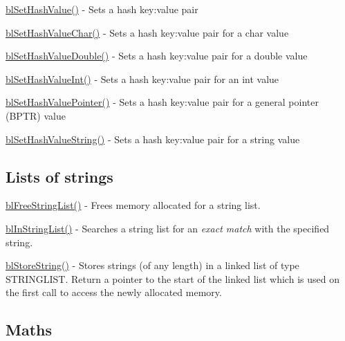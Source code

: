 \begin{DoxyItemize}
\item \hyperlink{hash_8c_a031d7ec8e0fbf9b3c44bbd024e8c7382}{bl\-Set\-Hash\-Value()} -\/ Sets a hash key\-:value pair
\item \hyperlink{hash_8c_a89d6ea94e8f4a1c4f385d29490f4d516}{bl\-Set\-Hash\-Value\-Char()} -\/ Sets a hash key\-:value pair for a char value
\item \hyperlink{hash_8c_adade2513a460bbbe4a8680226b894927}{bl\-Set\-Hash\-Value\-Double()} -\/ Sets a hash key\-:value pair for a double value
\item \hyperlink{hash_8c_a86e24fa6cec7538d295099ec761f40fc}{bl\-Set\-Hash\-Value\-Int()} -\/ Sets a hash key\-:value pair for an int value
\item \hyperlink{hash_8c_a91ff829e21fc02d7a0425b6b7fe33428}{bl\-Set\-Hash\-Value\-Pointer()} -\/ Sets a hash key\-:value pair for a general pointer (B\-P\-T\-R) value
\item \hyperlink{hash_8c_a9a90b6a5dcb4ef2ca2ebbb1cfbeeb65b}{bl\-Set\-Hash\-Value\-String()} -\/ Sets a hash key\-:value pair for a string value
\end{DoxyItemize}

\subsection*{Lists of strings }


\begin{DoxyItemize}
\item \hyperlink{_free_string_list_8c_a5a7f5b9d2713c87a595340f5c2c9590f}{bl\-Free\-String\-List()} -\/ Frees memory allocated for a string list.
\item \hyperlink{general_8h_a318621be88adcea6523add25a804f438}{bl\-In\-String\-List()} -\/ Searches a string list for an {\itshape exact match} with the specified string.
\item \hyperlink{general_8h_a6729e97bc8fa920ae9391a6fb91dc5be}{bl\-Store\-String()} -\/ Stores strings (of any length) in a linked list of type S\-T\-R\-I\-N\-G\-L\-I\-S\-T. Return a pointer to the start of the linked list which is used on the first call to access the newly allocated memory.
\end{DoxyItemize}

\subsection*{Maths }


